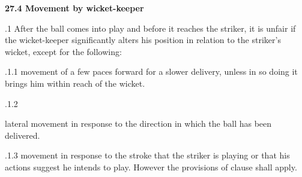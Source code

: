 \documentclass[12pt]{article}
\begin{document}
\vspace{\baselineskip}
{\fontsize{11pt}{13.2pt}\selectfont \textbf{27.4 \tabto{0.47in} Movement by wicket-keeper}\par}\par


\vspace{\baselineskip}
\begin{adjustwidth}{0.5in}{0.21in}
{\fontsize{9pt}{10.8pt}.1 \tabto{0.49in} After the ball comes into play and before it reaches the striker, it is unfair if the wicket-keeper significantly alters his position in relation to the striker’s wicket, except for the following:\par}\par

\end{adjustwidth}


\vspace{\baselineskip}
\begin{adjustwidth}{1.18in}{0.17in}
{\fontsize{9pt}{10.8pt}.1.1 \tabto{1.17in} movement of a few paces forward for a slower delivery, unless in so doing it brings him within reach of the wicket.\par}\par

\end{adjustwidth}


\vspace{\baselineskip}
\begin{adjustwidth}{0.49in}{0.0in}
{\fontsize{9pt}{10.8pt}.1.2 \tabto{1.17in} {\fontsize{8pt}{9.6pt}\selectfont lateral movement in response to the direction in which the ball has been delivered.\par}\par}\par

\end{adjustwidth}


\vspace{\baselineskip}
\begin{adjustwidth}{1.18in}{0.29in}
{\fontsize{9pt}{10.8pt}.1.3 \tabto{1.17in} movement in response to the stroke that the striker is playing or that his actions suggest he intends to play. However the provisions of clause shall apply.\par}\par

\end{adjustwidth}
\end{document}
